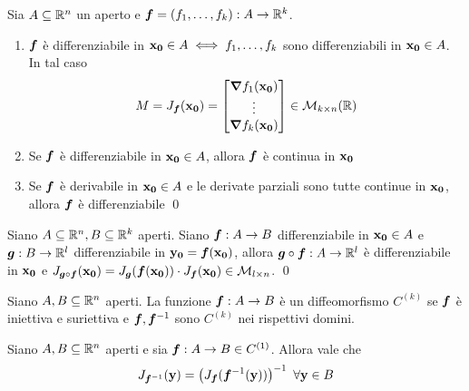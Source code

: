 \begin{theorem}
    Sia $A \subseteq \mathbb{R}^n$ un aperto e $\bm f= (f_1,\dots,f_k):A \to \mathbb{R}^k$.
    \begin{enumerate}
        \item $\bm f$ è differenziabile in $\vb{x_0} \in A \iff f_1,\dots,f_k$ sono differenziabili in $\vb{x_0} \in A$. In tal caso
        \begin{equation*}
            M=J_{\bm f}(\vb{x_0})=
            \begin{bmatrix}
                \grad f_1(\vb{x_0})\\
                \vdots\\
                \grad f_k(\vb{x_0})
            \end{bmatrix}
            \in \mathcal{M}_{k\times n}(\mathbb{R})
        \end{equation*}
        \item Se $\bm f$ è differenziabile in $\vb{x_0} \in A$, allora $\bm f$ è continua in $\vb{x_0}$
        \item Se $\bm f$ è derivabile in $\vb{x_0} \in A$ e le derivate parziali sono tutte continue in $\vb{x_0}$, allora $\bm f$ è differenziabile
        \qed
    \end{enumerate}
\end{theorem}

\begin{theorem}
    Siano $A\subseteq \mathbb{R}^n, B \subseteq \mathbb{R}^k$ aperti. Siano $\bm f: A \to B$ differenziabile in $\vb{x_0} \in A$ e $\bm g:B \to \mathbb{R}^l$ differenziabile in $\vb{y_0} = \bm f(\vb{x_0})$, allora $\bm g \circ \bm f : A \to \mathbb{R}^l$ è differenziabile in $\vb{x_0}$ e $J_{\bm g \circ \bm f}(\vb{x_0})=J_{\bm g}(\bm f (\vb{x_0}))\cdot J_{\bm f}(\vb{x_0}) \in \mathcal{M}_{l\times n}$.
    \qed
\end{theorem}

\begin{definition}
    [Diffeomorfismo]
    Siano $A,B \subseteq \mathbb{R}^n$ aperti. La funzione $\bm f: A \to B$ è un diffeomorfismo $C^{(k)}$ se $\bm f$ è iniettiva e suriettiva e $\bm f, \bm f^{-1}$ sono $C^{(k)}$ nei rispettivi domini.
\end{definition}

\begin{theorem}
    Siano $A,B \subseteq \mathbb{R}^n$ aperti e sia $\bm f:A\to B \in C^{(1)}$. Allora vale che
    \begin{equation*}
        J_{\bm f^{-1}}(\vb{y}) = \left(J_{\bm f}(\bm f^{-1}(\vb{y})) \right)^{-1} \ \forall \vb{y} \in B
    \end{equation*}
\end{theorem}

